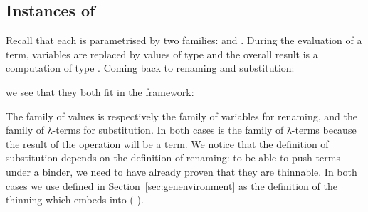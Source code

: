 \begin{agdasnippet}
  \addtolength{\leftskip}{\parindent}
\end{agdasnippet}


\subsection{Instances of \texorpdfstring{}{Semantics}}

Recall that each  is parametrised by two families: 
and . During the evaluation of a term, variables are replaced by
values of type  and the overall result is a computation of type .
Coming back to renaming and substitution:

\begin{minipage}{0.95\textwidth}
  \centering
  \begin{minipage}{0.6\textwidth}
  \end{minipage}
\end{minipage}

we see that they both fit in the
\semrec{} framework:

\begin{minipage}{0.95\textwidth}
  \begin{minipage}{0.47\textwidth}
  \end{minipage}\hfill
  \begin{minipage}{0.53\textwidth}
  \end{minipage}
\end{minipage}

The family  of values is respectively the family
of variables for renaming, and the family of λ-terms for substitution.
In both cases  is the family of λ-terms because the result of the
operation will be a term.
We notice that the definition of substitution depends on
the definition of renaming: to be able to push terms under a binder, we need to
have already proven that they are thinnable.
In both cases we use  defined in Section~\ref{sec:genenvironment} as the definition of the
thinning which embeds  into {(  )}.

